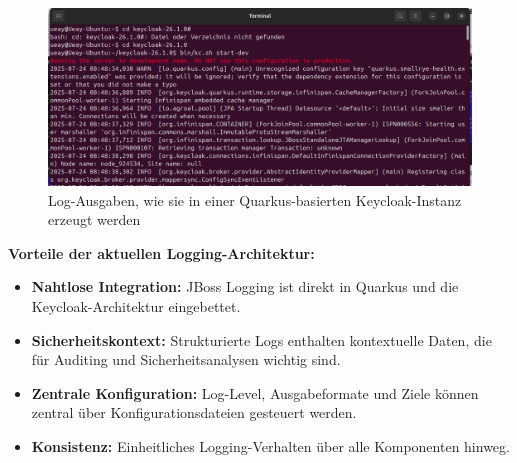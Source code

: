 \documentclass[a4paper,12pt]{article}
\begin{document}
	\begin{figure}[H]
		\centering
		\includegraphics[width=1.1\linewidth]{screenshot014}
		\caption{Log-Ausgaben, wie sie in einer Quarkus-basierten Keycloak-Instanz erzeugt werden}
		\label{fig:screenshot014}
	\end{figure}
	
	\vspace{0.5em}
	\textbf{Vorteile der aktuellen Logging-Architektur:}
	\begin{itemize}
		\item \textbf{Nahtlose Integration:} JBoss Logging ist direkt in Quarkus und die Keycloak-Architektur eingebettet.
		\item \textbf{Sicherheitskontext:} Strukturierte Logs enthalten kontextuelle Daten, die für Auditing und Sicherheitsanalysen wichtig sind.
		\item \textbf{Zentrale Konfiguration:} Log-Level, Ausgabeformate und Ziele können zentral über Konfigurationsdateien gesteuert werden.
		\item \textbf{Konsistenz:} Einheitliches Logging-Verhalten über alle Komponenten hinweg.
	\end{itemize}
	
\end{document}
